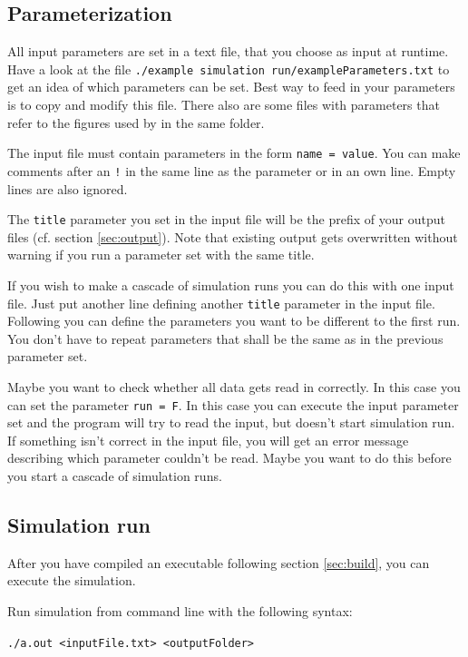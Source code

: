 \subsection{Parameterization}

All input parameters are set in a text file, that you choose as input at runtime. Have a look at the file \texttt{./example simulation run/exampleParameters.txt} to get an idea of which parameters can be set. Best way to feed in your parameters is to copy and modify this file. There also are some files with parameters that refer to the figures used by \citet{gav2012} in the same folder.

The input file must contain parameters in the form \texttt{name = value}. You can make comments after an \texttt{!} in the same line as the parameter or in an own line. Empty lines are also ignored.

The \texttt{title} parameter you set in the input file will be the prefix of your output files (cf. section \ref{sec:output}). Note that existing output gets overwritten without warning if you run a parameter set with the same title.

If you wish to make a cascade of simulation runs you can do this with one input file. Just put another line defining another \texttt{title} parameter in the input file. Following you can define the parameters you want to be different to the first run. You don't have to repeat parameters that shall be the same as in the previous parameter set.

Maybe you want to check whether all data gets read in correctly. In this case you can set the parameter \texttt{run = F}. In this case you can execute the input parameter set and the program will try to read the input, but doesn't start simulation run. If something isn't correct in the input file, you will get an error message describing which parameter couldn't be read. Maybe you want to do this before you start a cascade of simulation runs.


\subsection{Simulation run \label{sec:simulation}}

After you have compiled an executable following section \ref{sec:build}, you can execute the simulation.

Run simulation from command line with the following syntax:

\texttt{./a.out <inputFile.txt> <outputFolder>}

